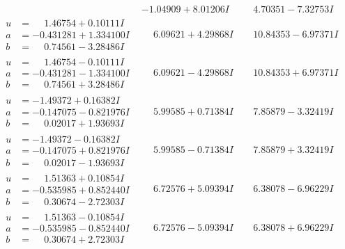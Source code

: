 \documentclass[1p]{elsarticle_modified}
\theoremstyle{definition}
\begin{document}
$$\begin{array}{c|c|c}
 & -1.04909 + 8.01206 I & \phantom{-}4.70351 - 7.32753 I \\ \hline\begin{aligned}
u &= \phantom{-}1.46754 + 0.10111 I \\
a &= -0.431281 + 1.334100 I \\
b &= \phantom{-}0.74561 - 3.28486 I\end{aligned}
 & \phantom{-}6.09621 + 4.29868 I & \phantom{-}10.84353 - 6.97371 I \\ \hline\begin{aligned}
u &= \phantom{-}1.46754 - 0.10111 I \\
a &= -0.431281 - 1.334100 I \\
b &= \phantom{-}0.74561 + 3.28486 I\end{aligned}
 & \phantom{-}6.09621 - 4.29868 I & \phantom{-}10.84353 + 6.97371 I \\ \hline\begin{aligned}
u &= -1.49372 + 0.16382 I \\
a &= -0.147075 - 0.821976 I \\
b &= \phantom{-}0.02017 + 1.93693 I\end{aligned}
 & \phantom{-}5.99585 + 0.71384 I & \phantom{-}7.85879 - 3.32419 I \\ \hline\begin{aligned}
u &= -1.49372 - 0.16382 I \\
a &= -0.147075 + 0.821976 I \\
b &= \phantom{-}0.02017 - 1.93693 I\end{aligned}
 & \phantom{-}5.99585 - 0.71384 I & \phantom{-}7.85879 + 3.32419 I \\ \hline\begin{aligned}
u &= \phantom{-}1.51363 + 0.10854 I \\
a &= -0.535985 + 0.852440 I \\
b &= \phantom{-}0.30674 - 2.72303 I\end{aligned}
 & \phantom{-}6.72576 + 5.09394 I & \phantom{-}6.38078 - 6.96229 I \\ \hline\begin{aligned}
u &= \phantom{-}1.51363 - 0.10854 I \\
a &= -0.535985 - 0.852440 I \\
b &= \phantom{-}0.30674 + 2.72303 I\end{aligned}
 & \phantom{-}6.72576 - 5.09394 I & \phantom{-}6.38078 + 6.96229 I \\ \hline\begin{aligned}

\end{aligned}
\end{array}$$
\end{document}
